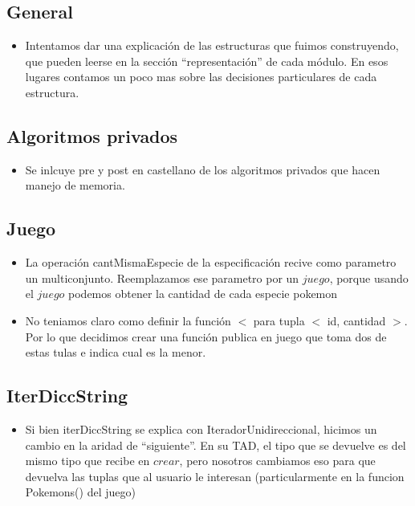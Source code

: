 
\subsection{General}

\begin{itemize}

\item{Intentamos dar una explicaci\'on de las estructuras que fuimos construyendo, que pueden leerse en la secci\'on ``representaci\'on'' de cada m\'odulo. En esos lugares contamos un poco mas sobre las decisiones particulares de cada estructura.}

\end{itemize}


\subsection{Algoritmos privados}

\begin{itemize}

\item{Se inlcuye pre y post en castellano de los algoritmos privados que hacen manejo de memoria.}

\end{itemize}


\subsection{Juego}

\begin{itemize}
\item{La operaci\'on cantMismaEspecie de la especificaci\'on recive como parametro un multiconjunto. 
Reemplazamos ese parametro por un $juego$, porque usando el $juego$ podemos obtener la cantidad de cada especie pokemon}

\item{No teniamos claro como definir la funci\'on $<$ para tupla $<$ id, cantidad $>$. Por lo que decidimos crear una funci\'on publica en juego que toma dos de estas tulas e indica cual es la menor.}

\end{itemize}


\subsection{IterDiccString}

\begin{itemize}

\item{Si bien iterDiccString se explica con IteradorUnidireccional, hicimos un cambio en la aridad de ``siguiente''. En su TAD, el tipo que se devuelve es del mismo tipo que recibe en $crear$, pero nosotros cambiamos eso para que devuelva las tuplas que al usuario le interesan (particularmente en la funcion Pokemons() del juego)}

\end{itemize}


